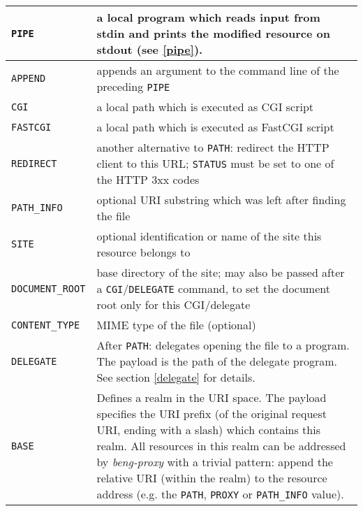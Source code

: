 \documentclass[a4paper,12pt]{article}
\begin{document}
\begin{longtable}{|l|p{8cm}|}
\hline

\texttt{PIPE} & a local program which reads input from stdin and
prints the modified resource on stdout (see \ref{pipe}). \\

\hline

\texttt{APPEND} & appends an argument to the command line of the
preceding \texttt{PIPE} \\

\hline

\texttt{CGI} & a local path which is executed as CGI script \\

\hline

\texttt{FASTCGI} & a local path which is executed as FastCGI script \\

\hline

\texttt{REDIRECT} & another alternative to \texttt{PATH}: redirect the
HTTP client to this URL; \texttt{STATUS} must be set to one of the
HTTP 3xx codes \\

\hline

\texttt{PATH\_INFO} & optional URI substring which was left after
finding the file \\

\hline

\texttt{SITE} & optional identification or name of the site this
resource belongs to \\

\hline

\texttt{DOCUMENT\_ROOT} & base directory of the site; may also be
passed after a \texttt{CGI}/\texttt{DELEGATE} command, to set the
document root only for this CGI/delegate \\

\hline

\texttt{CONTENT\_TYPE} & MIME type of the file (optional) \\

\hline

\texttt{DELEGATE} & After \texttt{PATH}: delegates opening the file to
a program.  The payload is the path of the delegate program.  See
section \ref{delegate} for details. \\

\hline

\texttt{BASE} & Defines a realm in the URI space.  The payload
specifies the URI prefix (of the original request URI, ending with a
slash) which contains this
realm.  All resources in this realm can be addressed by
\emph{beng-proxy} with a trivial pattern: append the relative URI
(within the realm) to the resource address (e.g. the \texttt{PATH},
\texttt{PROXY} or \texttt{PATH\_INFO} value).


\end{longtable}
\end{document}
